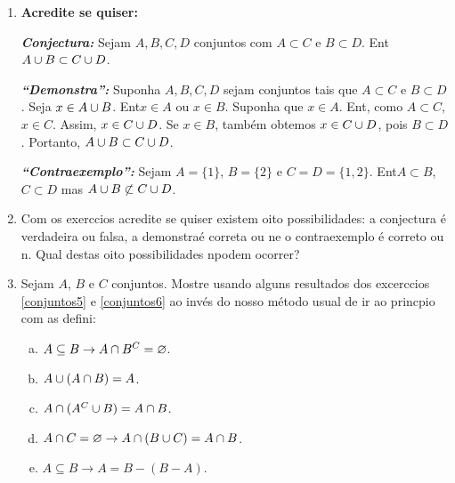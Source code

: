 \begin{enumerate}[{\bf 1.}]
\noindent \textit{\textbf{Conjectura:}} Seja $A$ e $B$ conjuntos tais que $A\subseteq B$. Ent\ao $A-B=\varnothing$.

\noindent \textit{\textbf{``Demonstra\caoi'':}} Suponha que $A$ e $B$ sejam conjuntos com $A\subseteq B$. Seja $x\in A-B$. Ent\ao $x\in B$ e $x\notin A$. Mas $A\subseteq B$ assim $x\notin A$ implica $x\notin B$, uma contradi\caoi. Logo, $A-B=\varnothing$.

\noindent \textit{\textbf{``Contraexemplo'':}} Seja $A=\{1,2,3\}$, $B=\{2,3\}$. Ent\ao $A\subseteq B$ mas $A-B\neq\varnothing$.

\item {\bf Acredite se quiser:}  

\noindent \textit{\textbf{Conjectura:}} Sejam $A,B,C,D$ conjuntos com $A\subset C$ e $B\subset D$. Ent\ao $A\cup B \subset C\cup D$. 

\noindent \textit{\textbf{``Demonstra\caoi'':}} Suponha $A,B,C,D$ sejam conjuntos tais que $A\subset C$ e $B\subset D$. Seja $x\in A\cup B$. Ent\ao $x\in A$ ou $x\in B$. Suponha que $x\in A$. Ent\aoi, como $A\subset C$, $x\in C$. Assim, $x\in C\cup D$. Se $x\in B$, tamb\'em obtemos $x\in C\cup D$, pois $B\subset D$. Portanto, $A\cup B\subset C\cup D$.

\noindent \textit{\textbf{``Contraexemplo'':}} Sejam $A=\{1\}$, $B=\{2\}$ e $C=D=\{1,2\}$. Ent\ao $A\subset B$, $C\subset D$ mas $A\cup B \not\subset C\cup D$.

\item Com os exerc\ih cios acredite se quiser existem oito possibilidades: a conjectura \'e verdadeira ou falsa, a demonstra\cao \'e correta ou n\ao e o contraexemplo \'e correto ou n\aoi. Qual destas oito possibilidades n\ao podem ocorrer?

\item Sejam $A$, $B$ e $C$ conjuntos. Mostre usando alguns resultados dos excerc\ih cios \ref{conjuntos5} e \ref{conjuntos6} ao inv\'es do nosso m\'etodo usual de ir ao princ\ih pio com as defini\cois:
\begin{enumerate}[a)]
\item $A\subseteq B \to A\cap B^C=\varnothing$.
\item $A\cup(A\cap B)=A$.
\item $A\cap(A^C\cup B)=A\cap B$.
\item $A\cap C=\varnothing \to A\cap(B\cup C)=A\cap B$.
\item $A\subseteq B \to A=B-(B-A)$.
\end{enumerate}


\end{enumerate}
